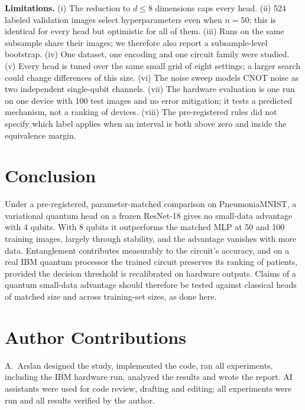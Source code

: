 \documentclass[conference]{IEEEtran}
\begin{document}
\textbf{Limitations.} (i) The reduction to $d\le8$ dimensions caps every
head. (ii) 524 labeled validation images select hyperparameters even when
$n=50$; this is identical for every head but optimistic for all of them.
(iii) Runs on the same subsample share their images; we therefore also
report a subsample-level bootstrap. (iv) One dataset, one encoding and one
circuit family were studied. (v) Every head is tuned over the same small grid of
eight settings; a larger search could change differences of this size.
(vi) The noise sweep models CNOT noise as two independent single-qubit
channels. (vii) The hardware evaluation is one run on one device with 100
test images and no error mitigation; it tests a predicted mechanism, not a
ranking of devices. (viii) The pre-registered rules did not specify which
label applies when an interval is both above zero and inside the
equivalence margin.

\section{Conclusion}
\label{sec:conclusion}
Under a pre-registered, parameter-matched comparison on PneumoniaMNIST,
a variational quantum head on a frozen ResNet-18 gives no small-data
advantage with 4 qubits. With 8 qubits it outperforms the matched MLP at
50 and 100 training images, largely through stability, and the
advantage vanishes with more data. Entanglement contributes measurably to
the circuit's accuracy, and on a real IBM quantum processor the trained
circuit preserves its ranking of patients, provided the decision
threshold is recalibrated on hardware outputs. Claims of a quantum
small-data advantage should therefore be tested against classical heads
of matched size and across training-set sizes, as done here.

\section*{Author Contributions}
A.~Arslan designed the study, implemented the code, ran all experiments,
including the IBM hardware run, analyzed the results and wrote the
report. AI assistants were used for code review, drafting and editing; all
experiments were run and all results verified by the author.
\end{document}
